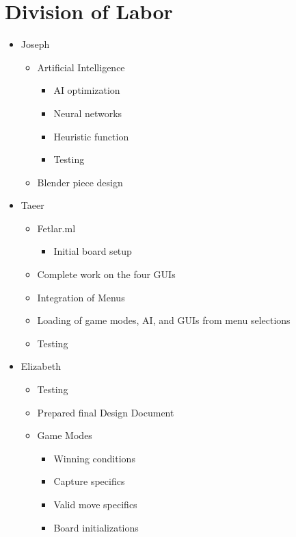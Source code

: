 \documentclass[11pt, oneside]{article}
\begin{document}
\section{Division of Labor}
\begin{itemize}
\item Joseph
  \begin{itemize}
    \item Artificial Intelligence
    \begin{itemize}
      \item AI optimization
      \item Neural networks
      \item Heuristic function
      \item Testing
    \end{itemize}
    \item Blender piece design
  \end{itemize}
\item Taeer
  \begin{itemize}
  \item Fetlar.ml
    \begin{itemize}
    \item Initial board setup
    \end{itemize}
  \item Complete work on the four GUIs
  \item Integration of Menus
  \item Loading of game modes, AI, and GUIs from menu selections
  \item Testing
  \end{itemize}
\item Elizabeth
  \begin{itemize}
  \item Testing
  \item Prepared final Design Document
  \item Game Modes
    \begin{itemize}
    \item Winning conditions
    \item Capture specifics
    \item Valid move specifics
    \item Board initializations
    \end{itemize}
  \end{itemize}
\end{itemize}
\end{document}

